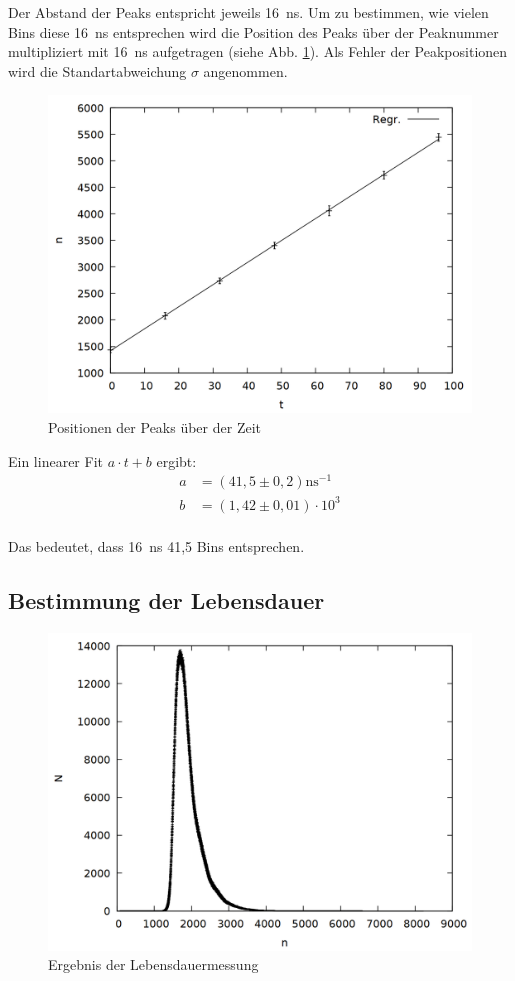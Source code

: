 Der Abstand der Peaks entspricht jeweils \SI{16}{\nano\second}. Um zu bestimmen, wie vielen Bins diese \SI{16}{\nano\second} entsprechen wird die Position des Peaks über der Peaknummer multipliziert mit \SI{16}{\nano\second} aufgetragen (siehe Abb. \ref{fig:prompt_time}). Als Fehler der Peakpositionen wird die Standartabweichung $\sigma$ angenommen.  

\begin{figure}[h]
\centering
\includegraphics[width=0.7\linewidth]{data/prompt_time.png}
\caption{Positionen der Peaks über der Zeit}
\label{fig:prompt_time}
\end{figure}

Ein linearer Fit $a\cdot t + b$ ergibt:\\
\begin{align*}
a &= (41,5 \pm 0,2) \si{\nano\second}^{-1}\\
b &= (1,42 \pm 0,01) \cdot 10^{3}\\
\end{align*}

Das bedeutet, dass \SI{16}{\nano\second} 41,5 Bins entsprechen.

\subsection{Bestimmung der Lebensdauer}

\begin{figure}[h]
\centering
\includegraphics[width=0.7\linewidth]{data/uebernacht.png}
\caption{Ergebnis der Lebensdauermessung}
\label{fig:halflife}
\end{figure}

